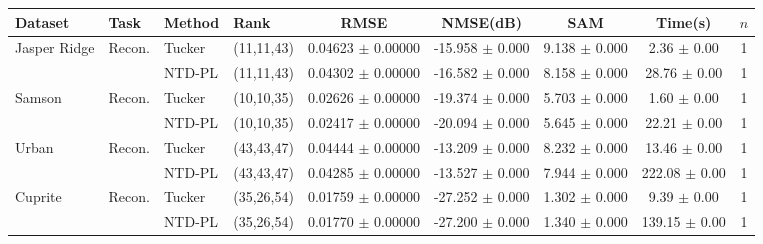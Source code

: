 \begin{tabular}{l l l l c c c c c}
    \toprule
    Dataset & Task & Method & Rank & RMSE & NMSE(dB) & SAM & Time(s) & $n$ \\
    \midrule
    Jasper Ridge & Recon. & Tucker & (11,11,43) & 0.04623 $\pm$ 0.00000 & -15.958 $\pm$ 0.000 & 9.138 $\pm$ 0.000 & 2.36 $\pm$ 0.00 & 1 \\
     &  & NTD-PL & (11,11,43) & 0.04302 $\pm$ 0.00000 & -16.582 $\pm$ 0.000 & 8.158 $\pm$ 0.000 & 28.76 $\pm$ 0.00 & 1 \\
    \midrule
    Samson & Recon. & Tucker & (10,10,35) & 0.02626 $\pm$ 0.00000 & -19.374 $\pm$ 0.000 & 5.703 $\pm$ 0.000 & 1.60 $\pm$ 0.00 & 1 \\
     &  & NTD-PL & (10,10,35) & 0.02417 $\pm$ 0.00000 & -20.094 $\pm$ 0.000 & 5.645 $\pm$ 0.000 & 22.21 $\pm$ 0.00 & 1 \\
    \midrule
    Urban & Recon. & Tucker & (43,43,47) & 0.04444 $\pm$ 0.00000 & -13.209 $\pm$ 0.000 & 8.232 $\pm$ 0.000 & 13.46 $\pm$ 0.00 & 1 \\
     &  & NTD-PL & (43,43,47) & 0.04285 $\pm$ 0.00000 & -13.527 $\pm$ 0.000 & 7.944 $\pm$ 0.000 & 222.08 $\pm$ 0.00 & 1 \\
    \midrule
    Cuprite & Recon. & Tucker & (35,26,54) & 0.01759 $\pm$ 0.00000 & -27.252 $\pm$ 0.000 & 1.302 $\pm$ 0.000 & 9.39 $\pm$ 0.00 & 1 \\
     &  & NTD-PL & (35,26,54) & 0.01770 $\pm$ 0.00000 & -27.200 $\pm$ 0.000 & 1.340 $\pm$ 0.000 & 139.15 $\pm$ 0.00 & 1 \\
    \bottomrule
\end{tabular}
